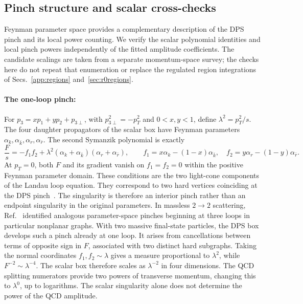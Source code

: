 
\subsection{Pinch structure and scalar cross-checks}
\label{sec:pinch}

Feynman parameter space provides a complementary
description of the DPS pinch and its local power
counting. We verify the scalar polynomial identities
and local pinch powers independently of the fitted
amplitude coefficients. The candidate scalings are
taken from a separate momentum-space survey; the
checks here do not repeat that enumeration or replace
the regulated region integrations of
Secs.~\ref{app:regions} and~\ref{sec:r0regions}.

\paragraph{The one-loop pinch: }
For $p_3=xp_1+yp_2+p_{3\perp}$, with
$p_{3\perp}^2=-p_T^2$ and $0<x,y<1$,
define $\lambda^2=p_T^2/s$.
The four daughter propagators of the scalar
box have Feynman parameters
$\alpha_k,\alpha_{\bar k},\alpha_r,
\alpha_{\bar r}$.
The second Symanzik polynomial is exactly
\begin{equation}
\frac{F}{s}=-f_1f_2+\lambda^2(\alpha_k+\alpha_{\bar k})(\alpha_r+\alpha_{\bar r}),
\qquad
f_1=x\alpha_k-(1-x)\alpha_{\bar k},\quad
f_2=y\alpha_r-(1-y)\alpha_{\bar r}.
\label{eq:pinchparameter}
\end{equation}
%
At $p_T=0$, both $F$ and its gradient
vanish on $f_1=f_2=0$ within the
positive Feynman parameter domain.
These conditions are the two light-cone
components of the Landau loop equation.
They correspond to two hard vertices
coinciding at the DPS pinch~\cite{Coleman:1965xm,Gaunt:2011xd}.
The singularity is therefore an
interior pinch rather than an endpoint
singularity in the original parameters.
%
In massless $2\to2$ scattering,
Ref.~\cite{Gardi:2024dissecting}
identified analogous parameter-space
pinches beginning at three loops
in particular nonplanar graphs.
With two massive final-state particles,
the DPS box develops such a pinch
already at one loop.
It arises from cancellations between
terms of opposite sign in $F$,
associated with two distinct
hard subgraphs.
%
Taking the normal coordinates
$f_1,f_2\sim\lambda$ gives a
measure proportional to $\lambda^2$,
while $F^{-2}\sim\lambda^{-4}$.
The scalar box therefore scales
as $\lambda^{-2}$ in four dimensions.
The QCD splitting numerators provide
two powers of transverse momentum,
changing this to $\lambda^0$,
up to logarithms.
The scalar singularity alone does not
determine the power of the QCD amplitude.

